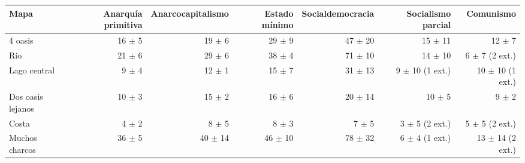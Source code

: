 \begin{tabular}{lrrrrrr}
\toprule
Mapa & Anarquía primitiva & Anarcocapitalismo & Estado mínimo & Socialdemocracia & Socialismo parcial & Comunismo \\
\midrule
4 oasis & 16 $\pm$ 5 & 19 $\pm$ 6 & 29 $\pm$ 9 & 47 $\pm$ 20 & 15 $\pm$ 11 & 12 $\pm$ 7 \\
Río & 21 $\pm$ 6 & 29 $\pm$ 6 & 38 $\pm$ 4 & 71 $\pm$ 10 & 14 $\pm$ 10 & 6 $\pm$ 7 (2 ext.) \\
Lago central & 9 $\pm$ 4 & 12 $\pm$ 1 & 15 $\pm$ 7 & 31 $\pm$ 13 & 9 $\pm$ 10 (1 ext.) & 10 $\pm$ 10 (1 ext.) \\
Dos oasis lejanos & 10 $\pm$ 3 & 15 $\pm$ 2 & 16 $\pm$ 6 & 20 $\pm$ 14 & 10 $\pm$ 5 & 9 $\pm$ 2 \\
Costa & 4 $\pm$ 2 & 8 $\pm$ 5 & 8 $\pm$ 3 & 7 $\pm$ 5 & 3 $\pm$ 5 (2 ext.) & 5 $\pm$ 5 (2 ext.) \\
Muchos charcos & 36 $\pm$ 5 & 40 $\pm$ 14 & 46 $\pm$ 10 & 78 $\pm$ 32 & 6 $\pm$ 4 (1 ext.) & 13 $\pm$ 14 (2 ext.) \\
\bottomrule
\end{tabular}
